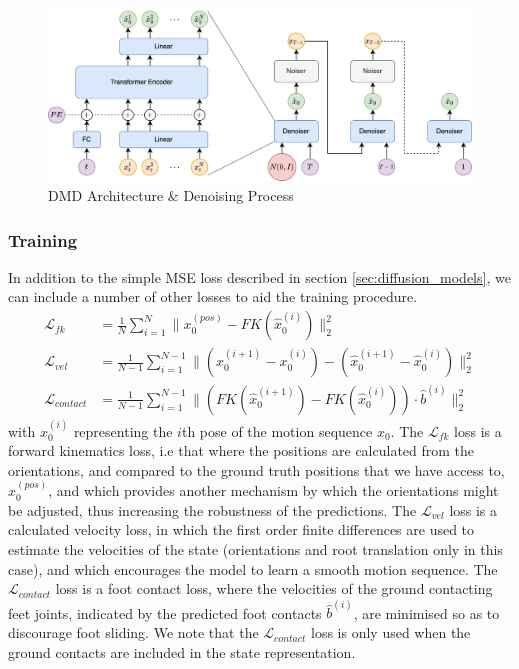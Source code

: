 \begin{figure}[!ht]
    \centering
    \includegraphics[width=1\textwidth]{Figures/diffusion/Network_diagram.png}
    \caption{DMD Architecture \& Denoising Process}
    \label{fig:dmd_architecture}
\end{figure}



\subsubsection{Training}
In addition to the simple MSE loss described in section \ref{sec:diffusion_models}, we can include a number of other losses to aid the training procedure.
\begin{equation}
    \begin{aligned}
        \mathcal{L}_{fk} &= \frac{1}{N} \sum_{i=1}^{N} \| x_0^{(pos)} - FK(\hat{x}_0^{(i)})  \|_2^2 \\
        \mathcal{L}_{vel} &= \frac{1}{N-1} \sum_{i=1}^{N-1} \| (x_0^{(i+1)} - x_0^{(i)}) - (\hat{x}_0^{(i+1)} - \hat{x}_0^{(i)}) \|_2^2 \\
        \mathcal{L}_{contact} &= \frac{1}{N-1} \sum_{i=1}^{N-1} \| \left( FK(\hat{x}_0^{(i+1)}) - FK(\hat{x}_0^{(i)}) \right) \cdot \hat{b}^{(i)}  \|_2^2
    \end{aligned}
\end{equation}
with $x_0^{(i)}$ representing the $i$th pose of the motion sequence $x_0$. The $\mathcal{L}_{fk}$ loss is a forward kinematics loss, i.e that where the positions are calculated from the orientations, and compared to the ground truth positions that we have access to, $x_0^{(pos)}$, and which provides another mechanism by which the orientations might be adjusted, thus increasing the robustness of the predictions. The $\mathcal{L}_{vel}$ loss is a calculated velocity loss, in which the first order finite differences are used to estimate the velocities of the state (orientations and root translation only in this case), and which encourages the model to learn a smooth motion sequence. The $\mathcal{L}_{contact}$ loss is a foot contact loss, where the velocities of the ground contacting feet joints, indicated by the predicted foot contacts $\hat{b}^(i)$, are minimised so as to discourage foot sliding. We note that the $\mathcal{L}_{contact}$ loss is only used when the ground contacts are included in the state representation.



